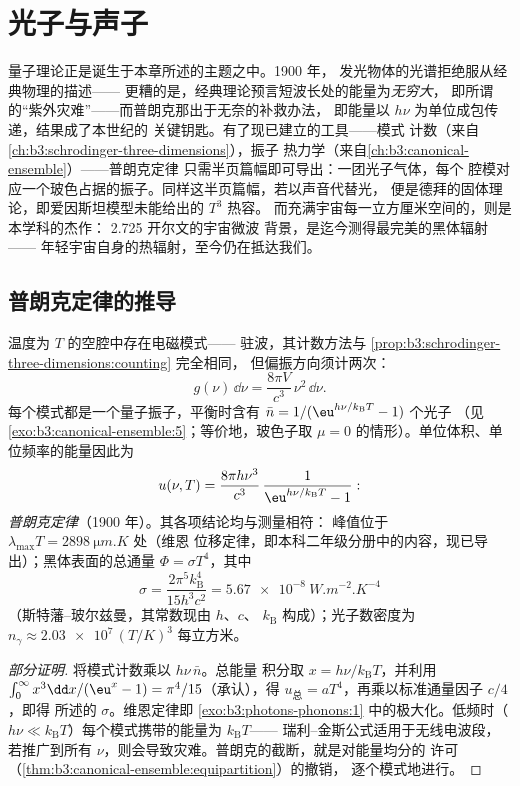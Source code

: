 \chapter{光子与声子}\label{ch:b3:photons-phonons}

量子理论正是诞生于本章所述的主题之中。1900 年，
发光物体的光谱拒绝服从经典物理的描述——
更糟的是，经典理论预言短波长处的能量为\emph{无穷大}，
即所谓的“紫外灾难”——而普朗克那出于无奈的补救办法，
即能量以 $h\nu$ 为单位成包传递，结果成了本世纪的
关键钥匙。有了现已建立的工具——模式
计数（来自\cref{ch:b3:schrodinger-three-dimensions}），振子
热力学（来自\cref{ch:b3:canonical-ensemble}）——普朗克定律
只需半页篇幅即可导出：一团光子气体，每个
腔模对应一个玻色占据的振子。同样这半页篇幅，若以声音代替光，
便是德拜的固体理论，即爱因斯坦模型未能给出的 $T^3$ 热容。
而充满宇宙每一立方厘米空间的，则是本学科的杰作：
2.725 开尔文的宇宙微波
背景，是迄今测得最完美的黑体辐射——
年轻宇宙自身的热辐射，至今仍在抵达我们。

\section{普朗克定律的推导}

\begin{theorem}[黑体辐射谱]\label{thm:b3:photons-phonons:planck}
温度为 $T$ 的空腔中存在电磁模式——
驻波，其计数方法与
\cref{prop:b3:schrodinger-three-dimensions:counting} 完全相同，
但偏振方向须计两次：
\[
g(\nu)\,\dd\nu = \frac{8\pi V}{c^3}\,\nu^2\,\dd\nu .
\]
每个模式都是一个量子振子，平衡时含有
$\bar n = 1/(\eu^{h\nu/k_{\text{B}}T} - 1)$ 个光子
（见\cref{exo:b3:canonical-ensemble:5}；等价地，玻色子取 $\mu =
0$ 的情形）。单位体积、单位频率的能量因此为
\[
u(\nu, T) = \frac{8\pi h\nu^3}{c^3}\,
\frac{1}{\eu^{h\nu/k_{\text{B}}T} - 1} :
\]
\emph{普朗克定律}（1900 年）。其各项结论均与测量相符：
峰值位于 $\lambda_{\max}T = \qty{2898}{\micro m.K}$ 处（维恩
位移定律，即本科二年级分册中的内容，现已导出）；黑体表面的总通量
$\Phi = \sigma T^4$，其中
\[
\sigma = \frac{2\pi^5k_{\text{B}}^4}{15h^3c^2}
 = \qty{5.67e-8}{W.m^{-2}.K^{-4}}
\]
（斯特藩–玻尔兹曼，其常数现由 $h$、$c$、
$k_{\text{B}}$ 构成）；光子数密度为 $n_\gamma \approx
\num{2.03e7}\,(T/\unit{K})^3$ 每立方米。
\end{theorem}

\begin{proof}[部分证明]
将模式计数乘以 $h\nu\,\bar n$。总能量
积分取 $x = h\nu/k_{\text{B}}T$，并利用 $\int_0^\infty
x^3\dd x/(\eu^x - 1) = \pi^4/15$（承认），得 $u_{\text{总}}
= aT^4$，再乘以标准通量因子 $c/4$，即得
所述的 $\sigma$。维恩定律即
\cref{exo:b3:photons-phonons:1} 中的极大化。低频时（$h\nu \ll
k_{\text{B}}T$）每个模式携带的能量为 $k_{\text{B}}T$——
瑞利–金斯公式适用于无线电波段，若推广到所有
$\nu$，则会导致灾难。普朗克的截断，就是对能量均分的
许可（\cref{thm:b3:canonical-ensemble:equipartition}）的撤销，
逐个模式地进行。
\end{proof}

